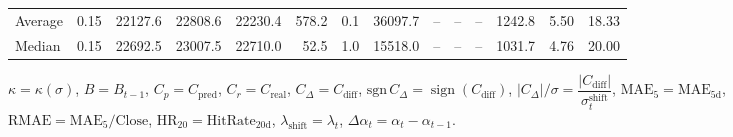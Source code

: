 \begin{threeparttable}
{\begin{tabular}{lrrrrrrrrrrrrr}
Average & 0.15 & 22127.6 & 22808.6 & 22230.4 & 578.2 & 0.1 & 36097.7 & -- & -- & -- & 1242.8 & 5.50 & 18.33 \\
Median & 0.15 & 22692.5 & 23007.5 & 22710.0 & 52.5 & 1.0 & 15518.0 & -- & -- & -- & 1031.7 & 4.76 & 20.00 \\
\bottomrule
\end{tabular}
}%
\begin{tablenotes}\footnotesize
\item $\kappa=\kappa(\sigma)$, $B=B_{t-1}$, $C_p=C_{\text{pred}}$, $C_r=C_{\text{real}}$, $C_\Delta=C_{\text{diff}}$, $\mathrm{sgn}\,C_\Delta=\operatorname{sign}(C_{\text{diff}})$, $|C_\Delta|/\sigma=\dfrac{|C_{\text{diff}}|}{\sigma_t^{\text{shift}}}$, $\mathrm{MAE}_5=\mathrm{MAE}_{5\text{d}}$, $\mathrm{RMAE}= \mathrm{MAE}_5 / \text{Close}$, $\mathrm{HR}_{20}=\mathrm{HitRate}_{20\text{d}}$, 
$\lambda_{\text{shift}}=\lambda_t$, 
$\Delta\alpha_t=\alpha_t-\alpha_{t-1}$.
\end{tablenotes}
\end{threeparttable}
\endgroup
